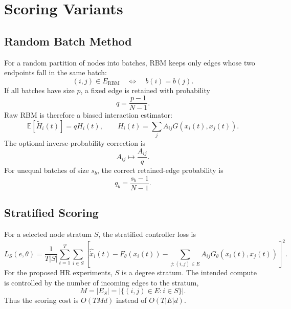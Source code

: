 \documentclass[11pt]{article}
\begin{document}
\section{Scoring Variants}

\subsection{Random Batch Method}

For a random partition of nodes into batches, RBM keeps only edges whose two
endpoints fall in the same batch:
\begin{equation}
    (i,j)\in E_{\mathrm{RBM}}
    \quad \Longleftrightarrow \quad
    b(i)=b(j).
\end{equation}
If all batches have size $p$, a fixed edge is retained with probability
\begin{equation}
    q=\frac{p-1}{N-1}.
\end{equation}
Raw RBM is therefore a biased interaction estimator:
\begin{equation}
    \mathbb{E}\left[\widetilde{H}_i(t)\right]
    =
    q H_i(t),
    \qquad
    H_i(t)=\sum_j A_{ij}G(x_i(t),x_j(t)).
\end{equation}
The optional inverse-probability correction is
\begin{equation}
    A_{ij}\mapsto \frac{A_{ij}}{q}.
\end{equation}
For unequal batches of size $s_b$, the correct retained-edge probability is
\begin{equation}
    q_b=\frac{s_b-1}{N-1}.
\end{equation}

\subsection{Stratified Scoring}

For a selected node stratum $S$, the stratified controller loss is
\begin{equation}
    L_S(e,\theta)
    =
    \frac{1}{T|S|}
    \sum_{t=1}^{T}\sum_{i\in S}
    \left[
    \widehat{\dot{x}}_i(t)
    -
    F_{\theta}(x_i(t))
    -
    \sum_{j:(i,j)\in E} A_{ij}
    G_{\theta}(x_i(t),x_j(t))
    \right]^2.
\end{equation}
For the proposed HR experiments, $S$ is a degree stratum.  The intended compute
is controlled by the number of incoming edges to the stratum,
\begin{equation}
    M = |E_S| = |\{(i,j)\in E:i\in S\}|.
\end{equation}
Thus the scoring cost is $O(TMd)$ instead of $O(T|E|d)$.
\end{document}
